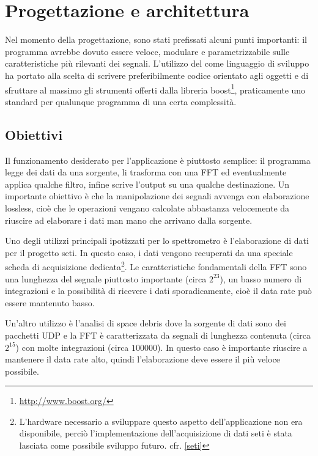 \chapter{Progettazione e architettura}
\label{outline}
Nel momento della progettazione, sono stati prefissati alcuni punti importanti:
il programma avrebbe dovuto essere veloce, modulare e parametrizzabile sulle
caratteristiche pi\`u rilevanti dei segnali. L'utilizzo del \CC come linguaggio di
sviluppo ha portato alla scelta di scrivere preferibilmente codice orientato
agli oggetti e di sfruttare al massimo gli strumenti offerti dalla libreria
boost\footnote{\url{http://www.boost.org/}}, praticamente uno standard per
qualunque programma \CC di una certa complessit\`a.
\section{Obiettivi}
Il funzionamento desiderato per l'applicazione \`e piuttosto semplice: il
programma legge dei dati da una sorgente, li trasforma con una \ac{FFT} ed
eventualmente applica qualche filtro, infine scrive l'output su una qualche
destinazione. Un importante obiettivo \`e che la manipolazione dei segnali
avvenga con elaborazione lossless, cio\`e che le operazioni vengano calcolate
abbastanza velocemente da riuscire ad elaborare i dati man mano che arrivano
dalla sorgente.

Uno degli utilizzi principali ipotizzati per lo spettrometro \`e l'elaborazione
di dati per il progetto \ac{seti}. In questo caso, i dati vengono recuperati da
una speciale scheda di acquisizione dedicata\footnote{L'hardware necessario a
sviluppare questo aspetto dell'applicazione non era disponibile, perci\`o
l'implementazione dell'acquisizione di dati \ac{seti} \`e stata lasciata come
possibile sviluppo futuro. cfr. \ref{seti}}.  Le caratteristiche fondamentali
della \ac{FFT} sono una lunghezza del segnale piuttosto importante (circa
$2^{23}$), un basso numero di integrazioni e la possibilit\`a di ricevere i dati
sporadicamente, cio\`e il data rate pu\`o essere mantenuto basso.

Un'altro utilizzo \`e l'analisi di space debris dove la sorgente di dati sono
dei pacchetti UDP e la \ac{FFT} \`e caratterizzata da segnali di lunghezza contenuta
(circa $2^{15}$) con molte integrazioni (circa $100000$). In questo caso \`e
importante riuscire a mantenere il data rate alto, quindi l'elaborazione deve
essere il pi\`u veloce possibile.

